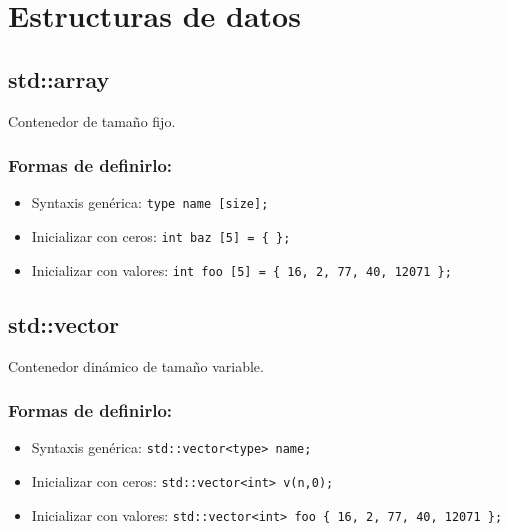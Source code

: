 \section{Estructuras de datos}
\label{sec:estructuras_de_datos}

\subsection{std::array}
\label{subsec:std_array}
Contenedor de tamaño fijo. 

\subsubsection*{Formas de definirlo:}
\begin{itemize}
  \item Syntaxis genérica: \texttt{type name [size];}
  \item Inicializar con ceros: \texttt{int baz [5] = \{ \};}
  \item Inicializar con valores: \texttt{int foo [5] = \{ 16, 2, 77, 40, 12071 \};}
\end{itemize}

\subsection{std::vector}
\label{subsec:std_vector}
Contenedor dinámico de tamaño variable.

\subsubsection*{Formas de definirlo:}
\begin{itemize}
  \item Syntaxis genérica: \texttt{std::vector<type> name;}
  \item Inicializar con ceros: \texttt{std::vector<int> v(n,0);}
  \item Inicializar con valores: \texttt{std::vector<int> foo \{ 16, 2, 77, 40, 12071 \};}
\end{itemize}

